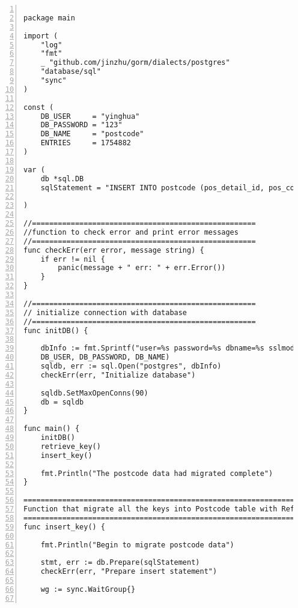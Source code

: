 \lstset{basicstyle=\ttfamily\tiny}  
\begin{lstlisting}[breaklines, frame=single, numbers=left, caption={Postcode Data Migration main program.}, label=commandline-02]

package main

import (
	"log"
	"fmt" 
	_ "github.com/jinzhu/gorm/dialects/postgres"
	"database/sql"
	"sync"
)

const (
	DB_USER     = "yinghua"
	DB_PASSWORD = "123"
	DB_NAME     = "postcode"
	ENTRIES	    = 1754882 
)

var ( 
	db *sql.DB
	sqlStatement = "INSERT INTO postcode (pos_detail_id, pos_county_id, pos_lac_id, pos_ward_id, pos_country_id, pos_region_id, pos_par_cons_id, pos_eer_id, pos_pct_id, pos_lsoa_id, pos_msoa_id, pos_oac_id, pos_greek_coordinate_id) values ($1, $2, $3, $4, $5, $6, $7, $8, $9, $10, $11, $12, $13);";

)

//====================================================
//function to check error and print error messages
//====================================================
func checkErr(err error, message string) {
	if err != nil {
		panic(message + " err: " + err.Error())
	}
}

//====================================================
// initialize connection with database
//====================================================
func initDB() {

	dbInfo := fmt.Sprintf("user=%s password=%s dbname=%s sslmode=disable",
	DB_USER, DB_PASSWORD, DB_NAME)
	sqldb, err := sql.Open("postgres", dbInfo)
	checkErr(err, "Initialize database")
	
	sqldb.SetMaxOpenConns(90)
	db = sqldb
}

func main() { 
	initDB()
	retrieve_key()
	insert_key()
	
	fmt.Println("The postcode data had migrated complete")
}

=======================================================================================
Function that migrate all the keys into Postcode table with Reference Integrity 
=======================================================================================
func insert_key() {

	fmt.Println("Begin to migrate postcode data")
	
	stmt, err := db.Prepare(sqlStatement)
	checkErr(err, "Prepare insert statement")
	
	wg := sync.WaitGroup{}
	

\end{lstlisting}
